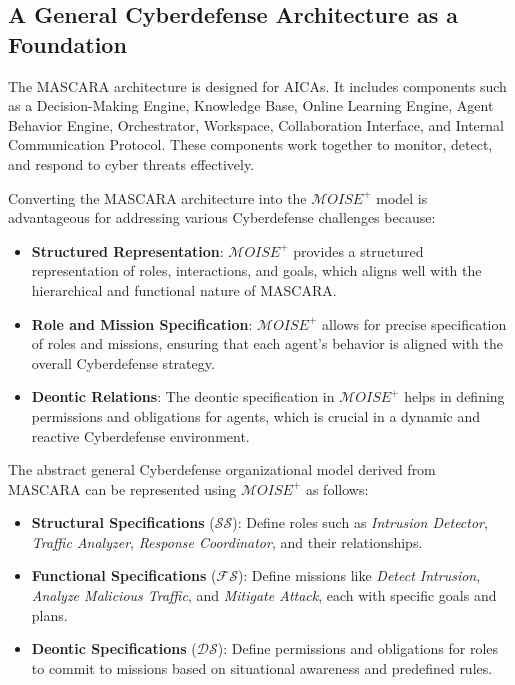 \documentclass[conference]{IEEEtran}
\newcounter{relation}
\begin{document}
\subsection{A General Cyberdefense Architecture as a Foundation}

The MASCARA architecture is designed for AICAs. It includes components such as a Decision-Making Engine, Knowledge Base, Online Learning Engine, Agent Behavior Engine, Orchestrator, Workspace, Collaboration Interface, and Internal Communication Protocol. These components work together to monitor, detect, and respond to cyber threats effectively.

Converting the MASCARA architecture into the $\mathcal{M}OISE^+$ model is advantageous for addressing various Cyberdefense challenges because:

\begin{itemize}
    \item \textbf{Structured Representation}: $\mathcal{M}OISE^+$ provides a structured representation of roles, interactions, and goals, which aligns well with the hierarchical and functional nature of MASCARA.
    \item \textbf{Role and Mission Specification}: $\mathcal{M}OISE^+$ allows for precise specification of roles and missions, ensuring that each agent's behavior is aligned with the overall Cyberdefense strategy.
    \item \textbf{Deontic Relations}: The deontic specification in $\mathcal{M}OISE^+$ helps in defining permissions and obligations for agents, which is crucial in a dynamic and reactive Cyberdefense environment.
\end{itemize}

The abstract general Cyberdefense organizational model derived from MASCARA can be represented using $\mathcal{M}OISE^+$ as follows:

\begin{itemize}
    \item \textbf{Structural Specifications} ($\mathcal{SS}$): Define roles such as \textit{Intrusion Detector}, \textit{Traffic Analyzer}, \textit{Response Coordinator}, and their relationships.
    \item \textbf{Functional Specifications} ($\mathcal{FS}$): Define missions like \textit{Detect Intrusion}, \textit{Analyze Malicious Traffic}, and \textit{Mitigate Attack}, each with specific goals and plans.
    \item \textbf{Deontic Specifications} ($\mathcal{DS}$): Define permissions and obligations for roles to commit to missions based on situational awareness and predefined rules.
\end{itemize}
\end{document}
